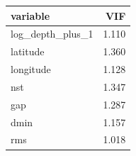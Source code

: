 \begin{tabular}{lr}
\toprule
variable & VIF \\
\midrule
log\_depth\_plus\_1 & 1.110 \\
latitude & 1.360 \\
longitude & 1.128 \\
nst & 1.347 \\
gap & 1.287 \\
dmin & 1.157 \\
rms & 1.018 \\
\bottomrule
\end{tabular}
